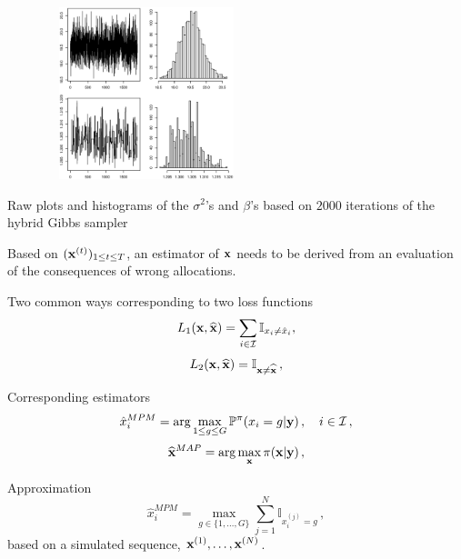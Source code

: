 \begin{slide}
\begin{figure}
\begin{center}
\includegraphics[width=6cm,height=5cm]{figures/betesig.eps}
\end{center}
\end{figure}

\footnotesize Raw plots and histograms of the $\sigma^2$'s and $\beta$'s based on $2000$
iterations of the hybrid Gibbs sampler

\end{slide}\begin{slide}

Based on $(\mathbf{x}^{(t)})_{1\le t\le T}$, an estimator of $\mathbf{x}$ needs to be derived from an
evaluation of the consequences of wrong allocations. 

\vs \pause Two common ways corresponding to two loss functions
$$
L_1(\mathbf{x},\widehat{\mathbf{x}}) = \sum_{i\in\mathcal{I}} \mathbb{I}_{x_i\ne\hat x_i},
$$
$$
L_2(\mathbf{x},\widehat{\mathbf{x}}) =  \mathbb{I}_{\mathbf{x}\ne\widehat{\mathbf{x}}}\,,
$$

\vs \pause Corresponding estimators
$$
\hat x^{MPM}_i=\arg\max_{1\le g\le G} \mathbb{P}^\pi(x_i=g|\mathbf{y})\,,\quad i\in\mathcal{I}\,,
$$
$$
\widehat{\mathbf{x}}^{MAP} = \arg\max_{\mathbf{x}} \pi(\mathbf{x}|\mathbf{y})\,,
$$

\end{slide}\begin{slide}


Approximation
$$
\hat x^{MPM}_i=\max_{g\in\{1,\ldots,G\}}\sum_{j=1}^N \mathbb{I}_{x_i^{(j)}=g}\,,
$$
based on a simulated sequence, $\mathbf{x}^{(1)},\ldots,\mathbf{x}^{(N)}$.

\end{slide}\begin{slide}


\end{slide}
